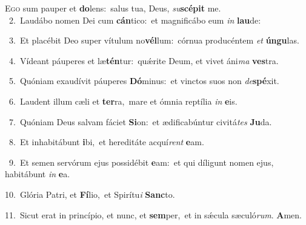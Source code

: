 \lettrine{\initial\textcolor{\initialcolor}{E}}{go} sum pauper et \textbf{do}\-lens:~\star salus tua, Deus, \textit{su}\-\textbf{scé}\textbf{pit} me.\\
{\numbfont\textcolor{\numbcolor}{~2.}}~Laudábo nomen Dei cum \textbf{cán}\-tico:~\star et magnificábo eum \textit{in} \textbf{lau}\-de:\par
{\numbfont\textcolor{\numbcolor}{~3.}}~Et placébit Deo super vítulum no\-\textbf{vél}\-lum:~\star córnua producéntem \textit{et} \textbf{ún}\-\textbf{gu}las.\par
{\numbfont\textcolor{\numbcolor}{~4.}}~Vídeant páuperes et læ\-\textbf{tén}\-tur:~\star quǽrite Deum, et vivet áni\textit{ma} \textbf{ves}\-tra.\par
{\numbfont\textcolor{\numbcolor}{~5.}}~Quóniam exaudívit páuperes \textbf{Dó}\-minus:~\star et vinctos suos non \textit{de}\-\textbf{spé}xit.\par
{\numbfont\textcolor{\numbcolor}{~6.}}~Laudent illum cæli et \textbf{ter}\-ra,~\star mare et ómnia reptília \textit{in} \textbf{e}\-is.\par
{\numbfont\textcolor{\numbcolor}{~7.}}~Quóniam Deus salvam fáciet \textbf{Si}\-on:~\star et ædificabúntur civitá\textit{tes} \textbf{Ju}\-da.\par
{\numbfont\textcolor{\numbcolor}{~8.}}~Et inhabitábunt \textbf{i}\-bi,~\star et hereditáte acquí\textit{rent} \textbf{e}\-am.\par
{\numbfont\textcolor{\numbcolor}{~9.}}~Et semen servórum ejus possidébit \textbf{e}\-am:~\star et qui díligunt nomen ejus, habitábunt \textit{in} \textbf{e}\-a.\par
{\numbfont\textcolor{\numbcolor}{10.}}~Glória Patri, et \textbf{Fí}\-lio,~\star et Spirítu\textit{i} \textbf{Sanc}\-to.\par
{\numbfont\textcolor{\numbcolor}{11.}}~Sicut erat in princípio, et nunc, et \textbf{sem}\-per,~\star et in sǽcula sæculó\-\textit{rum}\-. \textbf{A}\-men.\par
